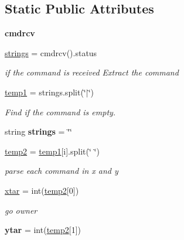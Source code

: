 \subsection*{Static Public Attributes}
\begin{DoxyCompactItemize}
\item 
{\bfseries cmdrcv}\hypertarget{classPet__behaviours_1_1Play_aada475410ff2bedf7fd94f7aff1be5d9}{}\label{classPet__behaviours_1_1Play_aada475410ff2bedf7fd94f7aff1be5d9}

\item 
\hyperlink{classPet__behaviours_1_1Play_ad7ecb0f90069cd70ebc3f86f92b51415}{strings} = cmdrcv().status\hypertarget{classPet__behaviours_1_1Play_ad7ecb0f90069cd70ebc3f86f92b51415}{}\label{classPet__behaviours_1_1Play_ad7ecb0f90069cd70ebc3f86f92b51415}

\begin{DoxyCompactList}\small\item\em if the command is received Extract the command \end{DoxyCompactList}\item 
\hyperlink{classPet__behaviours_1_1Play_a0140f371bf2370c8f93925750383841f}{temp1} = strings.\+split(\char`\"{}$\vert$\char`\"{})
\begin{DoxyCompactList}\small\item\em Find if the command is empty. \end{DoxyCompactList}\item 
string {\bfseries strings} = \char`\"{}\char`\"{}\hypertarget{classPet__behaviours_1_1Play_a14f33bb8029ad809dce5dc5f3c52078f}{}\label{classPet__behaviours_1_1Play_a14f33bb8029ad809dce5dc5f3c52078f}

\item 
\hyperlink{classPet__behaviours_1_1Play_ae50b6080952ef514d49a0e56483ce25f}{temp2} = \hyperlink{classPet__behaviours_1_1Play_a0140f371bf2370c8f93925750383841f}{temp1}\mbox{[}i\mbox{]}.split(\char`\"{} \char`\"{})\hypertarget{classPet__behaviours_1_1Play_ae50b6080952ef514d49a0e56483ce25f}{}\label{classPet__behaviours_1_1Play_ae50b6080952ef514d49a0e56483ce25f}

\begin{DoxyCompactList}\small\item\em parse each command in x and y \end{DoxyCompactList}\item 
\hyperlink{classPet__behaviours_1_1Play_aa7e0891e996e7d38e850cc388516b0c7}{xtar} = int(\hyperlink{classPet__behaviours_1_1Play_ae50b6080952ef514d49a0e56483ce25f}{temp2}\mbox{[}0\mbox{]})
\begin{DoxyCompactList}\small\item\em go owner \end{DoxyCompactList}\item 
{\bfseries ytar} = int(\hyperlink{classPet__behaviours_1_1Play_ae50b6080952ef514d49a0e56483ce25f}{temp2}\mbox{[}1\mbox{]})\hypertarget{classPet__behaviours_1_1Play_ad298b18a3f0f68219a9d2abdfaf84e00}{}\label{classPet__behaviours_1_1Play_ad298b18a3f0f68219a9d2abdfaf84e00}


\end{DoxyCompactItemize}
